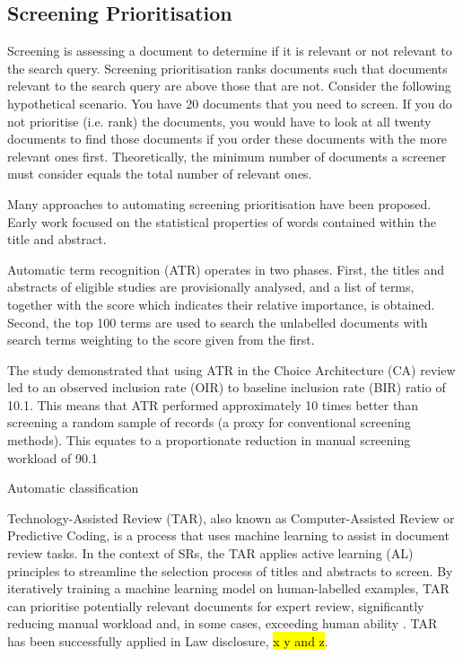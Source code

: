 \subsection{Screening Prioritisation}


Screening is assessing a document to determine if it is relevant or not relevant to the search query. Screening prioritisation ranks documents such that documents relevant to the search query are above those that are not. Consider the following hypothetical scenario. You have 20 documents that you need to screen. If you do not prioritise (i.e. rank) the documents, you would have to look at all twenty documents to find those documents if you order these documents with the more relevant ones first. Theoretically, the minimum number of documents a screener must consider equals the total number of relevant ones.

Many approaches to automating screening prioritisation have been proposed. Early work focused on the statistical properties of words contained within the title and abstract.






Automatic term recognition (ATR) operates in two phases. First, the titles and abstracts of eligible studies are provisionally analysed, and a list of terms, together with the score which indicates their relative importance, is obtained. Second, the top 100 terms are used to search the unlabelled documents with search terms weighting to the score given from the first. 

The study demonstrated that using ATR in the Choice Architecture (CA) review led to an observed inclusion rate (OIR) to baseline inclusion rate (BIR) ratio of 10.1. This means that ATR performed approximately 10 times better than screening a random sample of records (a proxy for conventional screening methods). This equates to a proportionate reduction in manual screening workload of 90.1


Automatic classification













Technology-Assisted Review (TAR), also known as Computer-Assisted Review or Predictive Coding, is a process that uses machine learning to assist in document review tasks. In the context of SRs, the TAR applies active learning (AL) principles to streamline the selection process of titles and abstracts to screen. By iteratively training a machine learning model on human-labelled examples, TAR can prioritise potentially relevant documents for expert review, significantly reducing manual workload and, in some cases, exceeding human ability \cite{grossman_technology-assisted_2010}. TAR has been successfully applied in Law disclosure, \hl{x y and z}.

